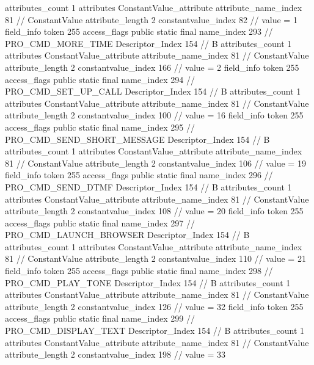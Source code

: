 {{{{{				attributes_count	1
				attributes {
				ConstantValue_attribute {
					attribute_name_index	81		// ConstantValue
					attribute_length	2
					constantvalue_index	82		// value = 1
				}
				}
			}
			field_info {
				token	255
				access_flags	public static final
				name_index	293		// PRO_CMD_MORE_TIME
				Descriptor_Index	154		// B
				attributes_count	1
				attributes {
				ConstantValue_attribute {
					attribute_name_index	81		// ConstantValue
					attribute_length	2
					constantvalue_index	166		// value = 2
				}
				}
			}
			field_info {
				token	255
				access_flags	public static final
				name_index	294		// PRO_CMD_SET_UP_CALL
				Descriptor_Index	154		// B
				attributes_count	1
				attributes {
				ConstantValue_attribute {
					attribute_name_index	81		// ConstantValue
					attribute_length	2
					constantvalue_index	100		// value = 16
				}
				}
			}
			field_info {
				token	255
				access_flags	public static final
				name_index	295		// PRO_CMD_SEND_SHORT_MESSAGE
				Descriptor_Index	154		// B
				attributes_count	1
				attributes {
				ConstantValue_attribute {
					attribute_name_index	81		// ConstantValue
					attribute_length	2
					constantvalue_index	106		// value = 19
				}
				}
			}
			field_info {
				token	255
				access_flags	public static final
				name_index	296		// PRO_CMD_SEND_DTMF
				Descriptor_Index	154		// B
				attributes_count	1
				attributes {
				ConstantValue_attribute {
					attribute_name_index	81		// ConstantValue
					attribute_length	2
					constantvalue_index	108		// value = 20
				}
				}
			}
			field_info {
				token	255
				access_flags	public static final
				name_index	297		// PRO_CMD_LAUNCH_BROWSER
				Descriptor_Index	154		// B
				attributes_count	1
				attributes {
				ConstantValue_attribute {
					attribute_name_index	81		// ConstantValue
					attribute_length	2
					constantvalue_index	110		// value = 21
				}
				}
			}
			field_info {
				token	255
				access_flags	public static final
				name_index	298		// PRO_CMD_PLAY_TONE
				Descriptor_Index	154		// B
				attributes_count	1
				attributes {
				ConstantValue_attribute {
					attribute_name_index	81		// ConstantValue
					attribute_length	2
					constantvalue_index	126		// value = 32
				}
				}
			}
			field_info {
				token	255
				access_flags	public static final
				name_index	299		// PRO_CMD_DISPLAY_TEXT
				Descriptor_Index	154		// B
				attributes_count	1
				attributes {
				ConstantValue_attribute {
					attribute_name_index	81		// ConstantValue
					attribute_length	2
					constantvalue_index	198		// value = 33
				}
				}
}}}}}
